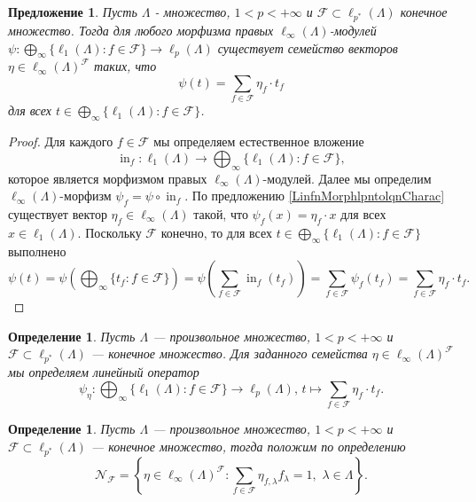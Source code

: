 \documentclass[12pt]{article}
\newtheorem{proposition}[theorem]{Предложение}
\newtheorem{definition}[theorem]{Определение}
\begin{document}
\begin{proposition}\label{ExtMorphSuml1ntlpnCharac}
    Пусть $\Lambda$ - множество, $1<p<+\infty$ 
    и $\mathcal{F}\subset \ell_{p^*}(\Lambda)$ конечное множество. Тогда для любого 
    морфизма правых $\ell_\infty(\Lambda)$-модулей
    $\psi:\bigoplus_\infty\{\ell_1(\Lambda):f\in\mathcal{F}\}\to\ell_p(\Lambda)$ 
    существует семейство векторов $\eta\in\ell_\infty(\Lambda)^\mathcal{F}$ 
    таких, что
    \[
        \psi(t)=\sum_{f\in\mathcal{F}} \eta_f \cdot t_f
    \]
    для всех $t\in \bigoplus_\infty\{ \ell_1(\Lambda):f\in\mathcal{F}\}$.
\end{proposition}
\begin{proof}
    Для каждого $f\in\mathcal{F}$ мы определяем естественное вложение
    \[
        \operatorname{in}_f:
        \ell_1(\Lambda)\to\bigoplus_\infty\{\ell_1(\Lambda):f\in\mathcal{F}\},
    \]
    которое является морфизмом правых $\ell_\infty(\Lambda)$-модулей. Далее мы 
    определим $\ell_\infty(\Lambda)$-морфизм 
    $\psi_f=\psi\circ \operatorname{in}_f$. 
    По предложению \ref{LinfnMorphlpntolqnCharac} существует 
    вектор $\eta_f\in\ell_\infty(\Lambda)$ такой, что $\psi_f(x)=\eta_f\cdot x$ 
    для всех $x\in\ell_1(\Lambda)$. Поскольку $\mathcal{F}$ конечно, то для 
    всех $t\in \bigoplus_\infty\{ \ell_1(\Lambda) : f\in \mathcal{F}\}$ 
    выполнено
    \[
        \psi(t)
        =\psi\left(\bigoplus_\infty\{ t_f : f\in\mathcal{F}\}\right)
        =\psi\left(\sum_{f\in\mathcal{F}} \operatorname{in}_f(t_f)\right)
        =\sum_{f\in\mathcal{F}}\psi_f(t_f)
        =\sum_{f\in\mathcal{F}} \eta_f\cdot t_f.
    \]
\end{proof}

\begin{definition}\label{ParamExtMorph}
    Пусть $\Lambda$ --- произвольное множество, $1<p<+\infty$ 
    и $\mathcal{F}\subset \ell_{p^*}(\Lambda)$ --- 
    конечное множество. Для заданного семейства 
    $\eta\in \ell_\infty(\Lambda)^\mathcal{F}$ мы определяем линейный оператор
    \[
        \psi_{\eta}:
        \bigoplus_\infty\{\ell_1(\Lambda):f\in\mathcal{F}\}\to\ell_p(\Lambda),\,
        t\mapsto\sum_{f\in\mathcal{F}} \eta_f\cdot t_f.
    \]
\end{definition}

\begin{definition}\label{ExtMorphs}
    Пусть $\Lambda$ --- произвольное множество, $1<p<+\infty$ 
    и $\mathcal{F}\subset\ell_{p^*}(\Lambda)$ --- 
    конечное множество, тогда положим по определению
    \[
        \mathcal{N}_{\mathcal{F}}=\left\{
            \eta\in \ell_\infty(\Lambda)^{\mathcal{F}} : 
            \sum_{f\in\mathcal{F}} \eta_{f,\lambda}f_\lambda=1,\,\,
            \lambda\in\Lambda
        \right\}.
    \]
\end{definition}
\end{document}
